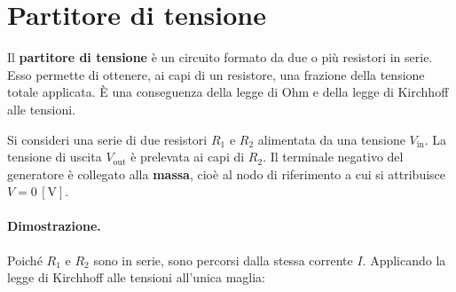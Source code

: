 \section{Partitore di tensione}

\begin{concetto}
Il \textbf{partitore di tensione} è un circuito formato da due o più resistori in serie. Esso permette di ottenere, ai capi di un resistore, una frazione della tensione totale applicata. È una conseguenza della legge di Ohm e della legge di Kirchhoff alle tensioni.
\end{concetto}


Si consideri una serie di due resistori \(R_1\) e \(R_2\) alimentata da una tensione \(V_{\text{in}}\). La tensione di uscita \(V_{\text{out}}\) è prelevata ai capi di \(R_2\). Il terminale negativo del generatore è collegato alla \textbf{massa}, cioè al nodo di riferimento a cui si attribuisce \(V = 0\,[\text{V}]\).

\begin{center}
\end{center}

\paragraph{Dimostrazione.}
Poiché \(R_1\) e \(R_2\) sono in serie, sono percorsi dalla stessa corrente \(I\). Applicando la legge di Kirchhoff alle tensioni all'unica maglia:

